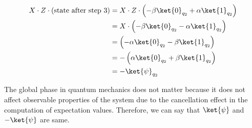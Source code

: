\documentclass[10pt,a4paper]{article}
\newcommand{\<}{\langle}
\renewcommand{\>}{\rangle}
\newcommand{\prths}[1]{\left( #1 \right)}
\begin{document}
\begin{align*}
X \cdot Z \cdot \prths {\textrm{state after step 3}}
& =
X \cdot Z \cdot \prths{
-\beta  \ket{0}_{q_2}
+\alpha \ket{1}_{q_2}
}
\\ & =
X \cdot \prths{
-\beta  \ket{0}_{q_2}
-\alpha \ket{1}_{q_2}
}
\\ & =
\prths{
-\alpha \ket{0}_{q_2}
-\beta  \ket{1}_{q_2}
}
\\ & =
-\prths{
\alpha \ket{0}_{q_2}
+\beta  \ket{1}_{q_2}
}
\\ & = -\ket{\psi}_{q_2}
\end{align*}

The global phase in quantum mechanics does not matter because it does not affect observable
properties of the system due to the cancellation effect in the computation of expectation values.
Therefore, we can say that $\ket{\psi}$ and $-\ket{\psi}$ are same.
\end{document}
